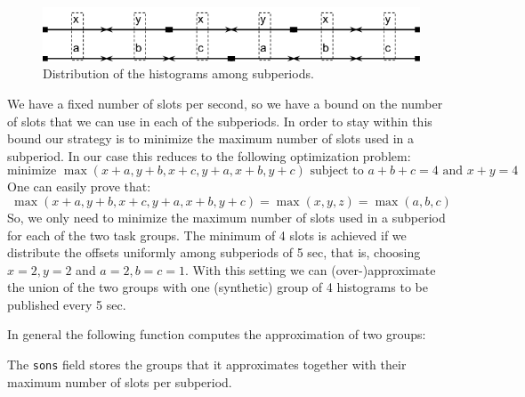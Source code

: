 \begin{figure}[ht!]
\centering
\includegraphics[scale=0.6]{Images/subperiod.png}
\caption{Distribution of the histograms among subperiods.}
\label{fig:subperiod}
\end{figure}

We have a fixed number of slots per second, so we have a bound on the number of slots that we can use in each of the subperiods. In order to stay within this bound our strategy is to minimize the maximum number of slots used in a subperiod. In our case this reduces to the following optimization problem:
$$ \text{minimize } \max(x+a, y+b, x+c, y+a, x+b, y+c) \text{ subject to } a+b+c=4 \text{ and } x+y = 4 $$
One can easily prove that:
$$ \max(x+a, y+b, x+c, y+a, x+b, y+c) = \max(x, y, z) = \max(a, b, c)$$
So, we only need to minimize the maximum number of slots used in a subperiod for each of the two task groups. The minimum of 4 slots is achieved if we distribute the offsets uniformly among subperiods of 5 sec, that is, choosing $x=2, y=2$ and $a=2, b=c=1$. With this setting we can (over-)approximate the union of the two groups with one (synthetic) group of 4 histograms to be published every 5 sec.

In general the following function computes the approximation of two groups:

The \verb+sons+ field stores the groups that it approximates together with their maximum number of slots per subperiod.

